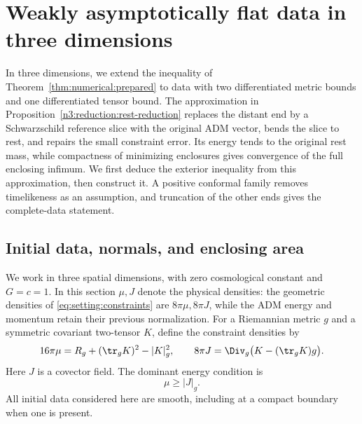 \section{Weakly asymptotically flat data in three dimensions}
\label{sec:weak3}\label{n3:intro:section}\label{n3:reduction:section}

In three dimensions, we extend the inequality of
Theorem~\ref{thm:numerical:prepared} to data with two differentiated metric
bounds and one differentiated tensor bound.
The approximation in Proposition~\ref{n3:reduction:rest-reduction}
replaces the distant end by a Schwarzschild reference slice with the
original ADM vector, bends the slice to rest, and repairs the small
constraint error. Its energy tends to the original rest mass, while
compactness of minimizing enclosures gives convergence of the full
enclosing infimum. We first deduce the exterior inequality from this
approximation, then construct it. A positive conformal family removes
timelikeness as an assumption, and truncation of the other ends gives
the complete-data statement.

\subsection{Initial data, normals, and enclosing area}

We work in three spatial dimensions, with zero cosmological constant and
\(G=c=1\). In this section $\mu,J$ denote the physical densities:
the geometric densities of \eqref{eq:setting:constraints} are
$8\pi\mu,8\pi J$, while the ADM energy and momentum retain their
previous normalization. For a Riemannian metric \(g\) and a symmetric covariant
two-tensor \(K\), define the constraint densities by
\begin{equation}\label{n3:intro:constraints}
 16\pi\mu=R_g+(\tr_gK)^2-|K|_g^2,\qquad
 8\pi J=\Div_g\bigl(K-(\tr_gK)g\bigr).
\end{equation}
Here \(J\) is a covector field. The dominant energy condition is
\begin{equation}\label{n3:intro:dec}
                         \mu\ge |J|_g.
\end{equation}
All initial data considered here are smooth, including at a compact
boundary when one is present.

